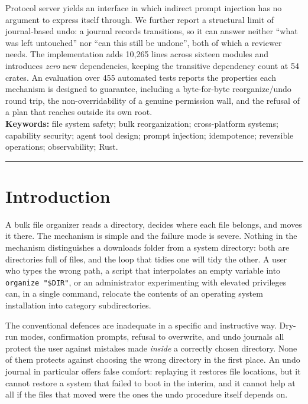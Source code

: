 \documentclass[11pt,a4paper]{article}
\newcommand{\code}[1]{\texttt{\small #1}}
\begin{document}
\begin{center}
\begin{minipage}{0.86\textwidth}
Protocol server yields an interface in which indirect prompt injection has no
argument to express itself through. We further report a structural limit of
journal-based undo: a journal records transitions, so it can answer neither
\enquote{what was left untouched} nor \enquote{can this still be undone},
both of which a reviewer needs.
The implementation adds 10{,}265 lines across sixteen modules and introduces
\emph{zero} new dependencies, keeping the transitive dependency count at 54 crates.
An evaluation over 455 automated tests reports the properties each mechanism is
designed to guarantee, including a byte-for-byte reorganize/undo round trip, the
non-overridability of a genuine permission wall, and the refusal of a plan that
reaches outside its own root.
\\[0.6em]
\textbf{Keywords:} file system safety; bulk reorganization; cross-platform systems;
capability security; agent tool design; prompt injection; idempotence;
reversible operations; observability; Rust.
\\[0.3em]
\rule{\textwidth}{0.8pt}
\end{minipage}
\end{center}

\vspace{1.2em}

\section{Introduction}
\label{sec:intro}

A bulk file organizer reads a directory, decides where each file belongs, and moves
it there. The mechanism is simple and the failure mode is severe. Nothing in the
mechanism distinguishes a downloads folder from a system directory: both are
directories full of files, and the loop that tidies one will tidy the other. A user
who types the wrong path, a script that interpolates an empty variable into
\code{organize "\$DIR"}, or an administrator experimenting with elevated privileges
can, in a single command, relocate the contents of an operating system installation
into category subdirectories.

The conventional defences are inadequate in a specific and instructive way. Dry-run
modes, confirmation prompts, refusal to overwrite, and undo journals all protect the
user against mistakes made \emph{inside} a correctly chosen directory. None of them
protects against choosing the wrong directory in the first place. An undo journal in
particular offers false comfort: replaying it restores file locations, but it cannot
restore a system that failed to boot in the interim, and it cannot help at all if the
files that moved were the ones the undo procedure itself depends on.
\end{document}
